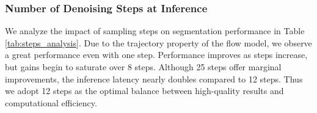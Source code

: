 
\subsubsection{Number of Denoising Steps at Inference}

We analyze the impact of sampling steps on segmentation performance in Table \ref{tab:steps_analysis}. Due to the trajectory property of the flow model, we observe a great performance even with one step. Performance improves as steps increase, but gains begin to saturate over 8 steps. Although 25 steps offer marginal improvements, the inference latency nearly doubles compared to 12 steps. Thus we adopt 12 steps as the optimal balance between high-quality results and computational efficiency.

